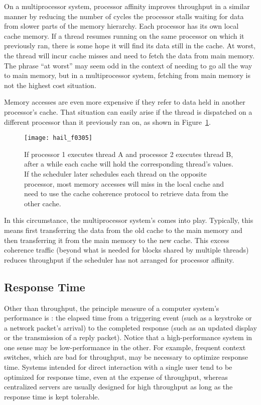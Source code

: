 On a multiprocessor system, processor affinity improves throughput in
a similar manner by reducing the number of cycles the processor
stalls waiting for data from slower parts of the memory hierarchy.
Each processor has its own local cache
memory.  If a thread resumes running on the same processor on which it
previously ran, there is some hope it will find its data still in
the cache.  At worst, the thread will incur cache misses and need to
fetch the data from main memory.  The phrase ``at worst'' may seem odd
in the context of needing to go all the way to main memory, but in a
multiprocessor system, fetching from main memory is not the highest
cost situation.

Memory accesses are even more expensive if they refer
to data held in another processor's cache.  That situation can easily
arise if the thread is dispatched on a different processor than it
previously ran on, as shown in Figure~\ref{scan-3-3}.
\begin{figure}
\centerline{\texttt{[image: hail\_f0305]}}
\caption{If processor 1 executes thread A and processor 2 executes
  thread B, after a while each cache will hold the corresponding
  thread's values.  If the scheduler later
  schedules each thread on the opposite processor, most
  memory accesses will miss in the local cache and need to use the
  cache coherence protocol to retrieve data from the other cache.}
\label{scan-3-3}
\end{figure}
In this circumstance, the multiprocessor system's
 comes into play.  Typically, this means first
transferring the data from the old cache to the main memory and then
transferring it from the main memory to the new cache.  This excess
coherence traffic (beyond what is needed for blocks shared by multiple
threads) reduces throughput if the scheduler has not arranged for
processor affinity.

\subsection{Response Time}\label{response-time-section}

Other than throughput, the principle measure of a computer system's
performance is : the elapsed time from a triggering event (such as
a keystroke or a network packet's arrival) to the completed response
(such as an updated display or the transmission of a reply packet).
Notice that a high-performance system in one sense may be
low-performance in the other.  For example, frequent context switches,
which are bad for throughput, may be necessary to optimize
response time.  Systems intended for direct interaction with a single
user tend to be optimized for response time, even at the expense of
throughput, whereas centralized servers are usually designed for high
throughput as long as the response time is kept tolerable.


